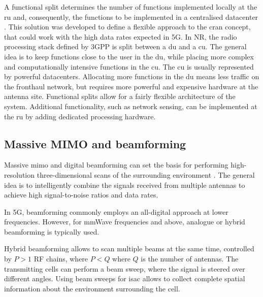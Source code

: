 	A functional split determines the number of functions implemented locally at the \gls{ru} and, consequently, the functions to be implemented in a centralised datacenter \cite{Larsen_Checko_Christiansen_2019}. 
 	This solution was developed to define a flexible approach to the \gls{cran} concept, that could work with the high data rates expected in 5G. 
	In \gls{NR}, the radio processing stack defined by \gls{3GPP} is split between a \gls{du} and a \gls{cu}. 
	The general idea is to keep functions close to the user in the \gls{du}, while placing more complex and computationally intensive functions in the \gls{cu}. The \gls{cu} is usually represented by powerful datacenters.
	Allocating more functions in the \gls{du} means less traffic on the fronthaul network, but requires more powerful and expensive hardware at the antenna site.
	Functional splits allow for a fairly flexible architecture of the system. Additional functionality, such as network sensing, can be implemented at the \gls{ru} by adding dedicated processing hardware.

	 
	
	\subsection{Massive MIMO and beamforming}
	
	Massive \gls{mimo} and digital beamforming can set the basis for performing high-resolution three-dimensional scans of the surrounding environment \cite{MIMO-next-gen}.
	The general idea is to intelligently combine the signals received from multiple antennas to achieve high signal-to-noise ratios and data rates.
	
	In \gls{5G}, beamforming commonly employs an all-digital approach at lower frequencies. However, for mmWave frequencies and above, analogue or hybrid beamforming is typically used. 
	
	Hybrid beamforming allows to scan multiple beams at the same time, controlled by $P >1$ RF chains, where $P < Q$ where $Q$ is the number of antennas. 
	The transmitting cells can perform a beam sweep, where the signal is steered over different angles. 
	Using beam sweeps for \gls{isac} allows to collect complete spatial information about the environment surrounding the cell.
	
